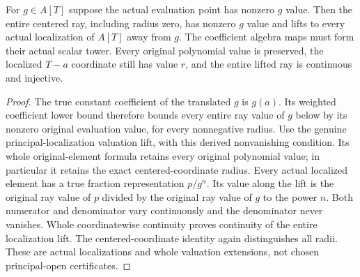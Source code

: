 \begin{theorem}
\label{spectrum:centered-gauss-principal-open-lift}
\leanok
{}
For $g\in A[T]$ suppose the actual evaluation point has nonzero $g$
value. Then the entire centered ray, including radius zero, has nonzero
$g$ value and lifts to every actual localization of $A[T]$ away from $g$.
The coefficient algebra maps must form their actual scalar tower.
Every original polynomial value is preserved, the localized $T-a$
coordinate still has value $r$, and the entire lifted ray is continuous
and injective.
\end{theorem}
\begin{proof}
The true constant coefficient of the translated $g$ is $g(a)$.
Its weighted coefficient lower bound therefore bounds every entire
ray value of $g$ below by its nonzero original evaluation value,
for every nonnegative radius. Use the genuine principal-localization
valuation lift, with this derived nonvanishing condition. Its whole
original-element formula retains every original polynomial value;
in particular it retains the exact centered-coordinate radius.
Every actual localized element has a true fraction representation
$p/g^n$. Its value along the lift is the original ray value of $p$
divided by the original ray value of $g$ to the power $n$.
Both numerator and denominator vary continuously and the denominator
never vanishes. Whole coordinatewise continuity proves continuity
of the entire localization lift. The centered-coordinate identity
again distinguishes all radii. These are actual localizations and
whole valuation extensions, not chosen principal-open certificates.
\end{proof}

